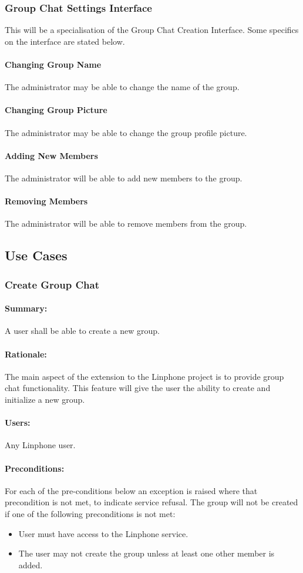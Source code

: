 \documentclass[11pt]{article}
\begin{document}
\subsubsection{Group Chat Settings Interface} This will be a specialisation of the Group Chat Creation Interface. Some specifics on the interface are stated below.
\paragraph{Changing Group Name} The administrator may be able to change the name of the group.
\paragraph{Changing Group Picture} The administrator may be able to change the group profile picture.
\paragraph{Adding New Members} The administrator will be able to add new members to the group.
\paragraph{Removing Members} The administrator will be able to remove  members from the group.

\subsection{Use Cases}
\subsubsection{Create Group Chat} \label{UC-create-group}
\paragraph{Summary:} A user shall be able to create a new group.
\paragraph{Rationale:} The main aspect of the extension to the Linphone project is to provide group chat functionality. This feature will give the user the ability to create and initialize a new group.
\paragraph{Users:}  Any Linphone user.
\paragraph{Preconditions:}For each of the pre-conditions below an exception is raised where that precondition is not met, to indicate service refusal.
The group will not be created if one of the following preconditions is not met:
\begin{itemize}
\item	User must have access to the Linphone service.
\item	The user may not create the group unless at least one other member is added.
\end{itemize}
\end{document}
